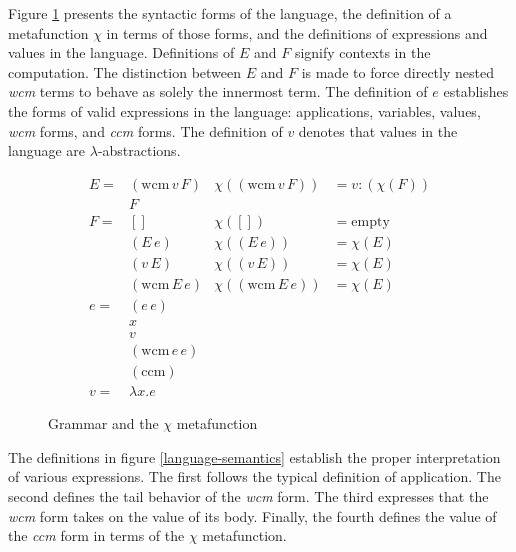 \documentclass[ms]{byuprop}
\newcounter{definition}
\begin{document}
Figure \ref{language-definition} presents the syntactic forms of the language, the 
definition of a metafunction $\chi$ in terms of those forms, and the definitions of 
expressions and values in the language. Definitions of $E$ and $F$ signify contexts in the 
computation. The distinction between $E$ and $F$ is made to force directly nested 
\emph{wcm} terms to behave as solely the innermost term. The definition of $e$ establishes 
the forms of valid expressions in the language: applications, variables, values, \emph{wcm} 
forms, and \emph{ccm} forms. The definition of $v$ denotes that values in the language 
are $\lambda$-abstractions.


\begin{figure}
\begin{align*}
E = &(\mathrm{wcm}\,v\,F) & \chi((\mathrm{wcm}\,v\,F)) &= v : (\chi(F))\\
    &F\\
F = &[]                   & \chi([])                   &= \mathrm{empty}\\
    &(E\,e)               & \chi((E\,e))               &= \chi(E)\\
    &(v\,E)               & \chi((v\,E))               &= \chi(E)\\
    &(\mathrm{wcm}\,E\,e) & \chi((\mathrm{wcm}\,E\,e)) &= \chi(E)\\
e = &(e\,e)\\
    &x\\
    &v\\
    &(\mathrm{wcm}\,e\,e)\\
    &(\mathrm{ccm})\\
v = & \lambda x. e
\end{align*}
\caption{Grammar and the $\chi$ metafunction}
\label{language-definition}
\end{figure}

The definitions in figure \ref{language-semantics} establish the proper interpretation of 
various expressions. The first follows the typical definition of application. The second 
defines the tail behavior of the \emph{wcm} form. The third expresses that the \emph{wcm} 
form takes on the value of its body. Finally, the fourth defines the value of the \emph{ccm} 
form in terms of the $\chi$ metafunction.
\end{document}
